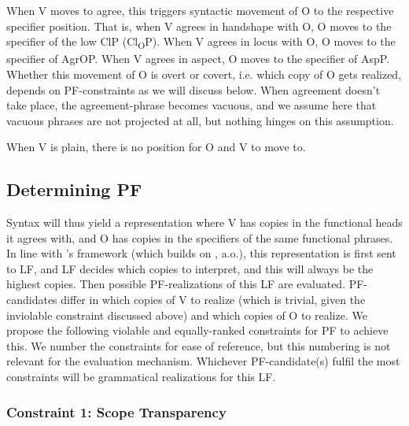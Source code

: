 \documentclass[output=paper,colorlinks,citecolor=brown,
]{langscibook}
\newcommand{\citeapos}[1]{\citeauthor{#1}'s \citeyearpar{#1}}
\begin{document}
\noindent 
When V moves to agree, this triggers syntactic movement of O to the
respective specifier position. That is, when V agrees in handshape
with O, O moves to the specifier of the low ClP (Cl\textsubscript{O}P). When V agrees in
locus with O, O moves to the specifier of AgrOP. When V agrees in
aspect, O moves to the specifier of AspP. Whether this movement of O
is overt or covert, i.e. which copy of O gets realized, depends on
PF-constraints as we will discuss below. When agreement doesn’t take
place, the agreement-phrase becomes vacuous, and we assume here
that vacuous phrases are not projected at all, but nothing hinges on this
assumption.

When V is plain, there is no position for O and V to move to.

\subsection{Determining PF} 
    \label{lasz:sec:23}

Syntax will thus yield a representation where V has copies in the
functional heads it agrees with, and O has copies in the specifiers of
the same functional phrases. In line with \citeapos{Bobaljik.Wurmbrand.2012} 
framework (which builds on \citealp{Bobaljik.1995,Bobaljik.2002,Brody.1995,ErteschikShir.1997}, a.o.), 
this representation is first sent to LF, and
LF decides which copies to interpret, and this will always be the
highest copies. Then possible PF-realizations of this LF are evaluated.
PF-candidates differ in which copies of V to realize (which is trivial,
given the inviolable constraint discussed above) and which copies of
O to realize. We propose the following violable and equally-ranked
constraints for PF to achieve this. We number the constraints for ease
of reference, but this numbering is not relevant for the evaluation
mechanism. Whichever PF-candidate(s) fulfil the most constraints will
be grammatical realizations for this LF.

\subsubsection*{Constraint 1: Scope Transparency}
\end{document}
